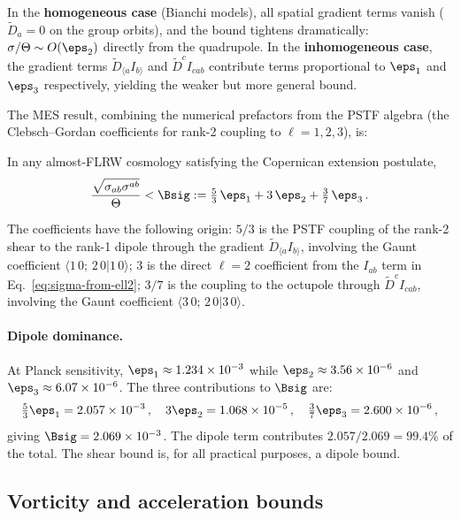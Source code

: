 In the \textbf{homogeneous case} (Bianchi models), all spatial
gradient terms vanish ($\tilde{D}_a = 0$ on the group orbits),
and the bound tightens dramatically: $\sigma/\Theta \sim
O(\eps_2)$ directly from the quadrupole.  In the
\textbf{inhomogeneous case}, the gradient terms
$\tilde{D}_{\langle a}I_{b\rangle}$ and
$\tilde{D}^c I_{cab}$ contribute terms proportional to
$\eps_1$ and $\eps_3$ respectively, yielding the weaker but
more general bound.

The MES result, combining the numerical prefactors from the
PSTF algebra (the Clebsch--Gordan coefficients for rank-2
coupling to $\ell = 1, 2, 3$), is:

\begin{theorem}\label{thm:MES-shear}
In any almost-FLRW cosmology satisfying the Copernican
extension postulate,
\begin{equation}\label{eq:Bsig-def}
\frac{\sqrt{\sigma_{ab}\sigma^{ab}}}{\Theta}
< \Bsig
:= \tfrac{5}{3}\,\eps_1 + 3\,\eps_2 + \tfrac{3}{7}\,\eps_3\,.
\end{equation}
\end{theorem}

The coefficients have the following origin:
$5/3$ is the PSTF coupling of the rank-2 shear to the
rank-1 dipole through the gradient
$\tilde{D}_{\langle a}I_{b\rangle}$, involving the
Gaunt coefficient $\langle 1\,0;\,2\,0|1\,0\rangle$;
$3$ is the direct $\ell = 2$ coefficient from the
$I_{ab}$ term in Eq.~\eqref{eq:sigma-from-ell2};
$3/7$ is the coupling to the octupole through
$\tilde{D}^c I_{cab}$, involving the Gaunt coefficient
$\langle 3\,0;\,2\,0|3\,0\rangle$.

\paragraph{Dipole dominance.}
At Planck sensitivity, $\eps_1 \approx 1.234 \times 10^{-3}$
while $\eps_2 \approx 3.56 \times 10^{-6}$ and
$\eps_3 \approx 6.07 \times 10^{-6}$.  The three contributions
to $\Bsig$ are:
\begin{equation}\label{eq:dipole-dominance}
\tfrac{5}{3}\eps_1 = 2.057 \times 10^{-3}\,,\quad
3\eps_2 = 1.068 \times 10^{-5}\,,\quad
\tfrac{3}{7}\eps_3 = 2.600 \times 10^{-6}\,,
\end{equation}
giving $\Bsig = 2.069 \times 10^{-3}$.  The dipole term
contributes $2.057/2.069 = 99.4\%$ of the total.  The shear
bound is, for all practical purposes, a dipole bound.


\subsection{Vorticity and acceleration bounds}
\label{sec:om-udot-bounds}

